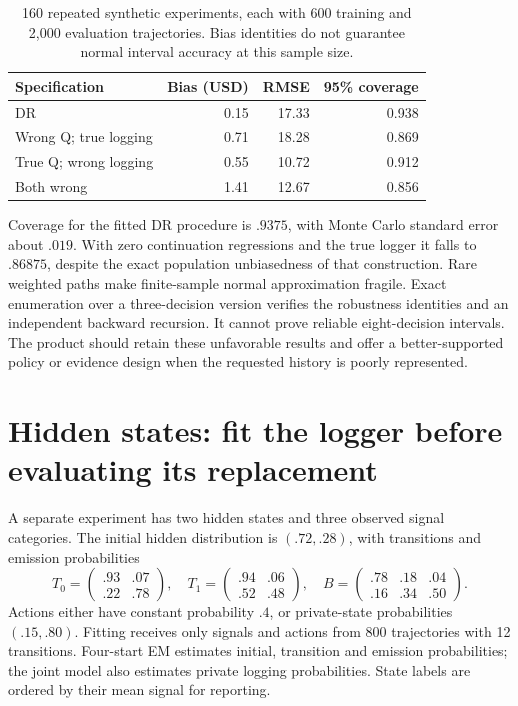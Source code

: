 \begin{table}[htbp]\centering\small


\begin{tabular}{@{}lrrr@{}}
\toprule
Specification & Bias (USD) & RMSE & 95\% coverage\\
\midrule
DR & 0.15 & 17.33 & 0.938\\
Wrong Q; true logging & 0.71 & 18.28 & 0.869\\
True Q; wrong logging & 0.55 & 10.72 & 0.912\\
Both wrong & 1.41 & 12.67 & 0.856\\
\bottomrule
\end{tabular}



\caption{160 repeated synthetic experiments, each with 600 training and
2,000 evaluation trajectories. Bias identities do not guarantee normal
interval accuracy at this sample size.}
\label{r3:collections-coverage}
\end{table}

Coverage for the fitted DR procedure is $.9375$, with Monte Carlo
standard error about $.019$. With zero continuation regressions and
the true logger it falls to $.86875$, despite the exact population
unbiasedness of that construction. Rare weighted paths make finite-sample
normal approximation fragile. Exact enumeration over a three-decision
version verifies the robustness identities and an independent backward
recursion. It cannot prove reliable eight-decision intervals.
The product should retain these unfavorable results and offer a
better-supported policy or evidence design when the requested history
is poorly represented.

\section{Hidden states: fit the logger before evaluating its replacement}
\label{r3:latent-study}

A separate experiment has two hidden states and three observed signal
categories. The initial hidden distribution is $(.72,.28)$, with
transitions and emission probabilities
\[
 T_0=\begin{pmatrix}.93&.07\\.22&.78\end{pmatrix},\quad
 T_1=\begin{pmatrix}.94&.06\\.52&.48\end{pmatrix},\quad
 B=\begin{pmatrix}.78&.18&.04\\.16&.34&.50\end{pmatrix}.
\]
Actions either have constant probability $.4$, or private-state
probabilities $(.15,.80)$. Fitting receives only signals and actions
from 800 trajectories with 12 transitions. Four-start EM estimates
initial, transition and emission probabilities; the joint model also
estimates private logging probabilities. State labels are ordered by
their mean signal for reporting.

